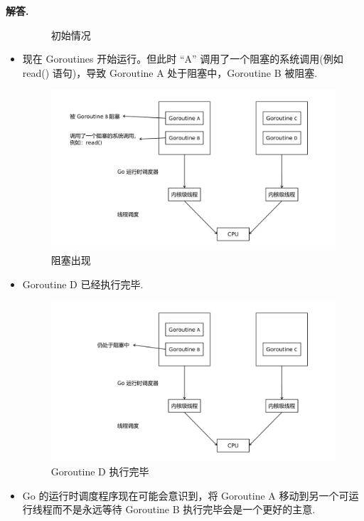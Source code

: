 \documentclass[12pt, a4paper, oneside]{ctexart}
\newenvironment{solution}{\par\noindent\textbf{解答. }}{\par}
\begin{document}
\begin{solution}
\begin{itemize}
\begin{figure}[!htbp]
                \caption{初始情况}
                \label{fig2}
            \end{figure}
        \item 现在 Goroutines 开始运行。但此时 “A” 调用了一个阻塞的系统调用(例如 read() 语句)，导致 Goroutine A 处于阻塞中，Goroutine B 被阻塞.
            \begin{figure}[!htbp]
                \centering
                \includegraphics[width=13cm]{images/fig3.pdf}
                \caption{阻塞出现}
                \label{fig3}
            \end{figure}
        \item Goroutine D 已经执行完毕.
            \begin{figure}[!htbp]
                \centering
                \includegraphics[width=13cm]{images/fig4.pdf}
                \caption{Goroutine D 执行完毕}
                \label{fig4}
            \end{figure}
        \item Go 的运行时调度程序现在可能会意识到，将 Goroutine A 移动到另一个可运行线程而不是永远等待 Goroutine B 执行完毕会是一个更好的主意.
            \begin{figure}[!htbp]

\end{figure}
\end{itemize}
\end{solution}
\end{document}
